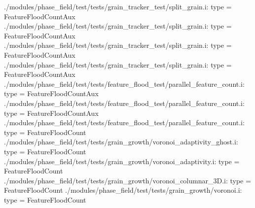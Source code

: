 ./modules/phase_field/test/tests/grain_tracker_test/split_grain.i:    type = FeatureFloodCountAux
./modules/phase_field/test/tests/grain_tracker_test/split_grain.i:    type = FeatureFloodCountAux
./modules/phase_field/test/tests/grain_tracker_test/split_grain.i:    type = FeatureFloodCountAux
./modules/phase_field/test/tests/grain_tracker_test/split_grain.i:    type = FeatureFloodCountAux
./modules/phase_field/test/tests/feature_flood_test/parallel_feature_count.i:    type = FeatureFloodCountAux
./modules/phase_field/test/tests/feature_flood_test/parallel_feature_count.i:    type = FeatureFloodCountAux
./modules/phase_field/test/tests/feature_flood_test/parallel_feature_count.i:    type = FeatureFloodCount
./modules/phase_field/test/tests/grain_growth/voronoi_adaptivity_ghost.i:    type = FeatureFloodCount
./modules/phase_field/test/tests/grain_growth/voronoi_adaptivity.i:    type = FeatureFloodCount
./modules/phase_field/test/tests/grain_growth/voronoi_columnar_3D.i:    type = FeatureFloodCount
./modules/phase_field/test/tests/grain_growth/voronoi.i:    type = FeatureFloodCount

